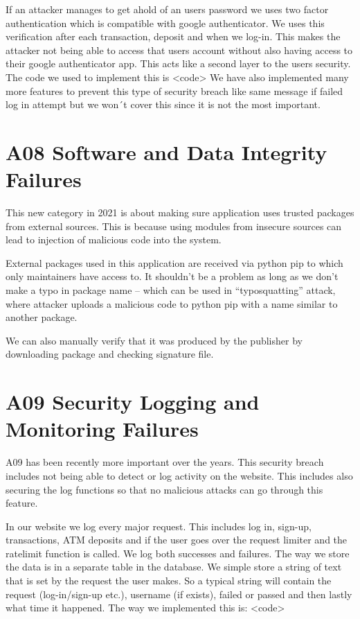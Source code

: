 If an attacker manages to get ahold of an users password we uses two factor authentication which is compatible with google authenticator. We uses this verification after each transaction, deposit and when we log-in. This makes the attacker not being able to access that users account without also having access to their google authenticator app. This acts like a second layer to the users security.  The code we used to implement this is <code>
We have also implemented many more features to prevent this type of security breach like same message if failed log in attempt but we won´t cover this since it is not the most important. 


\section{A08 Software and Data Integrity Failures}

This new category in 2021 is about making sure application uses trusted packages from external sources. This is because using modules from insecure sources can lead to injection of malicious code into the system.

External packages used in this application are received via python pip to which only maintainers have access to. It shouldn’t be a problem as long as we don’t make a typo in package name – which can be used in “typosquatting” attack, where attacker uploads a malicious code to python pip with a name similar to another package.

We can also manually verify that it was produced by the publisher by downloading package and checking signature file.

\section{A09 Security Logging and Monitoring Failures}

A09 has been recently more important over the years. This security breach includes not being able to detect or log activity on the website. This includes also securing the log functions so that no malicious attacks can go through this feature. 

In our website we log every major request. This includes log in, sign-up, transactions, ATM deposits and if the user goes over the request limiter and the ratelimit function is called. We log both successes and failures. The way we store the data is in a separate table in the database. We simple store a string of text that is set by the request the user makes. So a typical string will contain the request (log-in/sign-up etc.), username (if exists), failed or passed and then lastly what time it happened. The way we implemented this is: <code>

